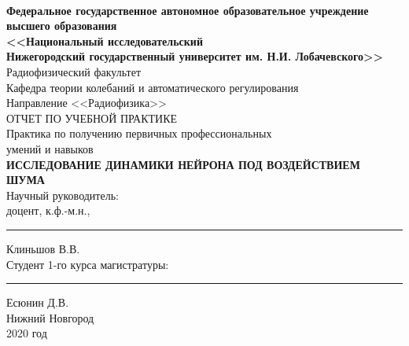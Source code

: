 \begin{titlepage}
	\fontsize{13pt}{13pt} \selectfont
	{\centering
	\linespread{1}
	\\[13pt]
		{\fontsize{13pt}{13pt} \selectfont\bf  Федеральное государственное автономное образовательное учреждение \\
		высшего образования \\
		<<Национальный исследовательский \\ Нижегородский
		государственный университет им. Н.И. Лобачевского>>
		}\\[12pt] 
	{\fontsize{13pt}{13pt} \selectfont
	Радиофизический факультет\\
	Кафедра теории колебаний и автоматического регулирования\\[28pt]
	Направление <<Радиофизика>>\\
	\vspace{30pt}
	ОТЧЕТ ПО УЧЕБНОЙ ПРАКТИКЕ\\}
	\vspace{15pt}
	{\fontsize{15pt}{15pt}
	Практика по получению первичных профессиональных\\
	умений и навыков
	\vspace{15pt}
	}\\
	{\fontsize{13pt}{13pt}\textbf{
		ИССЛЕДОВАНИЕ ДИНАМИКИ НЕЙРОНА ПОД ВОЗДЕЙСТВИЕМ ШУМА
	}}\\
	\vspace{48pt}}\fontsize{12pt}{12pt} \selectfont
	\noindent
	Научный руководитель:\\[0.4em]
	доцент, к.ф.-м.н.,\hfill \rule{2cm}{1pt} Клиньшов В.В. \hphantom{,}\\[40pt]
	Студент 1-го курса магистратуры:
	\hfill \rule{2cm}{1pt} Есюнин Д.В. \hphantom{aa,}\\[30pt]
	\vfill
	\centering
	Нижний Новгород\\[0.4em]
	2020 год
\end{titlepage}
\clearpage
\restoregeometry
